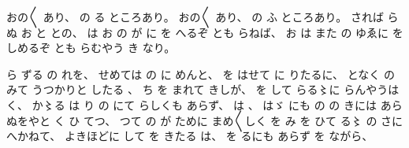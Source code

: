 
%
おの〳〵
あり、
%
の
る
ところあり。
%
おの〳〵
あり、%
%
の%
ふ
ところあり。
%
されば
らぬ
お
と
との、
%
は
お
の
が
に
を
へるぞ
とも
らねば、
%
お
は
また
の
ゆゑに
を
しめるぞ
とも
らむやう
き
なり。

%
ら
ずる
の
れを、
%
せめては
の
に
めんと、
%
を
はせて
に
りたるに、
%
となく
の
みて
うつかりと
したる
、
%
ち
を
まれて
きしが、
%
を%
して
らる〻に%
らんやうは
く、
%
か〻る%
は
り
の
にて
らしくも
あらず、
%
は
、
%
はゞ%
にも
の%
の
きには
あらぬをやと
く
ひ
てつ、
%
つて
の
が
ために
まめ〳〵しく
を
み%
を
ひて
る〻%
の
さに
へかねて、
%
よきほどに
して
を
きたる
は、
%
を
るにも
あらず
を%
ながら、
